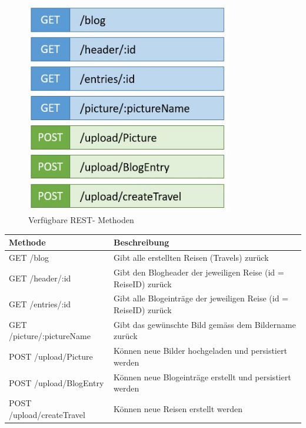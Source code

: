 \documentclass[../main.tex]{subfiles}
\begin{document}
\begin{figure}[h]
    \centering
    \includegraphics[width=0.8\textwidth]{rest-api}
    \caption{Verfügbare REST- Methoden}
    \label{fig:rest-api}
\end{figure}
\vspace{0.5cm}

\begin{tabular}{ p{5cm} p{5cm}}
 \hline
 \textbf{Methode} & \textbf{Beschreibung}\\
 \hline
 GET /blog                 &   Gibt alle erstellten Reisen (Travels) zurück                         \\ \hline
 GET /header/:id           &   Gibt den Blogheader der jeweiligen Reise (id = ReiseID) zurück       \\ \hline
 GET /entries/:id          &   Gibt alle Blogeinträge der jeweiligen Reise (id = ReiseID) zurück    \\ \hline
 GET /picture/:pictureName &   Gibt das gewünschte Bild gemäss dem Bildername zurück                \\ \hline
 POST /upload/Picture      &   Können neue Bilder hochgeladen und persistiert werden                \\ \hline
 POST /upload/BlogEntry    &   Können neue Blogeinträge erstellt und persistiert werden             \\ \hline
 POST /upload/createTravel &   Können neue Reisen erstellt werden                                   \\ \hline
\end{tabular}
\end{document}
